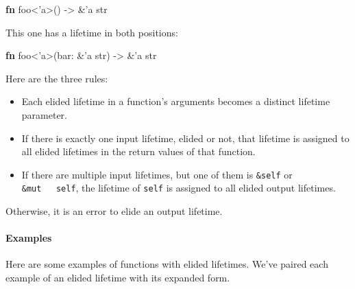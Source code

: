 \documentclass[a4paper,]{book}
\newenvironment{Shaded}{\begin{snugshade}}{\end{snugshade}}
\newcommand{\KeywordTok}[1]{\textcolor[rgb]{0.13,0.29,0.53}{\textbf{{#1}}}}
\newcommand{\DataTypeTok}[1]{\textcolor[rgb]{0.13,0.29,0.53}{{#1}}}
\newcommand{\OtherTok}[1]{\textcolor[rgb]{0.56,0.35,0.01}{{#1}}}
\newcommand{\NormalTok}[1]{{#1}}
\let\oldparagraph\paragraph
\renewcommand{\paragraph}[1]{\oldparagraph{#1}\mbox{}}
\begin{document}
\begin{Shaded}
\begin{Highlighting}[]
\KeywordTok{fn} \NormalTok{foo<}\OtherTok{'a}\NormalTok{>() -> &}\OtherTok{'a} \DataTypeTok{str}
\end{Highlighting}
\end{Shaded}

This one has a lifetime in both positions:

\begin{Shaded}
\begin{Highlighting}[]
\KeywordTok{fn} \NormalTok{foo<}\OtherTok{'a}\NormalTok{>(bar: &}\OtherTok{'a} \DataTypeTok{str}\NormalTok{) -> &}\OtherTok{'a} \DataTypeTok{str}
\end{Highlighting}
\end{Shaded}

Here are the three rules:

\begin{itemize}
\item
  Each elided lifetime in a function's arguments becomes a distinct
  lifetime parameter.
\item
  If there is exactly one input lifetime, elided or not, that lifetime
  is assigned to all elided lifetimes in the return values of that
  function.
\item
  If there are multiple input lifetimes, but one of them is
  \texttt{\&self} or \texttt{\&mut\ \ \ self}, the lifetime of
  \texttt{self} is assigned to all elided output lifetimes.
\end{itemize}

Otherwise, it is an error to elide an output lifetime.

\paragraph{Examples}\label{examples}

Here are some examples of functions with elided lifetimes. We've paired
each example of an elided lifetime with its expanded form.
\end{document}
